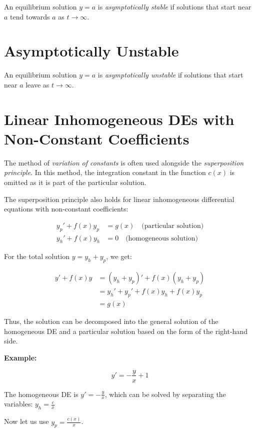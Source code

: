 An equilibrium solution \(y = a\) is \emph{asymptotically stable} if solutions
that start near \(a\) tend towards \(a\) as \(t \to \infty\).

\section{Asymptotically Unstable}

An equilibrium solution \(y = a\) is \emph{asymptotically unstable} if solutions
that start near \(a\) leave as \(t \to \infty\).

\section{Linear Inhomogeneous DEs with Non-Constant Coefficients}

The method of \emph{variation of constants} is often used alongside the \emph{superposition principle}.
In this method, the integration constant in the function \( c(x) \) is omitted as it is part of the
particular solution.

The superposition principle also holds for linear inhomogeneous differential equations with
non-constant coefficients:

\begin{align*}
    y_p' + f(x)y_p & = g(x) \quad \text{(particular solution)} \\
    y_h' + f(x)y_h & = 0 \quad \text{(homogeneous solution)}
\end{align*}

For the total solution \( y = y_h + y_p \), we get:

\begin{align*}
    y' + f(x)y
     & = (y_h + y_p)' + f(x)(y_h + y_p)  \\
     & = y_h' + y_p' + f(x)y_h + f(x)y_p \\
     & = g(x)
\end{align*}

Thus, the solution can be decomposed into the general solution of the homogeneous DE and a
particular solution based on the form of the right-hand side.

\textbf{Example: }

\[
    y' = -\frac{y}{x} + 1
\]

The homogeneous DE is \(y' = -\frac{y}{x}\), which can be solved by separating the variables:
\(y_h = \frac{c}{x}\)

Now let us use \(y_p = \frac{c(x)}{x}\).

